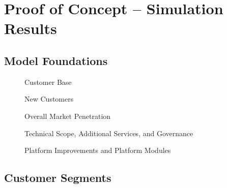 \chapter{Proof of Concept -- Simulation Results}\label{ch:app05}

\section{Model Foundations}\label{ch:app05:mf}

\begin{figure}[htb]
	\centering
	
	\caption{Customer Base}
\end{figure}

\begin{figure}[htb]
	\centering
	
	\caption{New Customers}
	\label{fig:sim:nc}
\end{figure}

\begin{figure}[htb]
	\centering
	
	\caption{Overall Market Penetration}
\end{figure}

\begin{figure}[htb]
	\centering
	
	\caption{Technical Scope, Additional Services, and Governance}
\end{figure}

\begin{figure}[htb]
	\centering
	
	\caption{Platform Improvements and Platform Modules}
	\label{fig:sim:pm}
\end{figure}

\clearpage
\section{Customer Segments}\label{ch:app05:cs}

